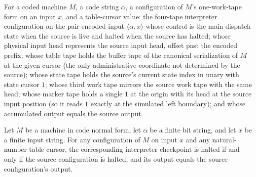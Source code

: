 \begin{definition}
\label{Turing.universalSimulationCfg}
\leanok
{}
For a coded machine $M$, a code string $\alpha$, a configuration of $M$'s
one-work-tape form on an input $x$, and a table-cursor value: the four-tape
interpreter configuration on the pair-encoded input
$\langle \alpha, x \rangle$ whose control is the main dispatch state when the
source is live and halted when the source has halted; whose physical input
head represents the source input head, offset past the encoded prefix; whose
table tape holds the buffer tape of the canonical serialization of $M$ at
the given cursor (the only administrative coordinate not determined by the
source); whose state tape holds the source's current state index in unary
with state cursor $1$; whose third work tape mirrors the source work tape
with the same head; whose marker tape holds a single $1$ at the origin with
its head at the source input position (so it reads $1$ exactly at the
simulated left boundary); and whose accumulated output equals the source
output.
\end{definition}

\begin{lemma}
\label{Turing.universalSimulation_fields}
\leanok
{}
Let $M$ be a machine in code normal form, let $\alpha$ be a finite bit string, and let
$x$ be a finite input string. For any configuration of $M$ on input $x$ and any
natural-number table cursor, the corresponding interpreter checkpoint is halted if and
only if the source configuration is halted, and its output equals the source
configuration’s output.
\end{lemma}

